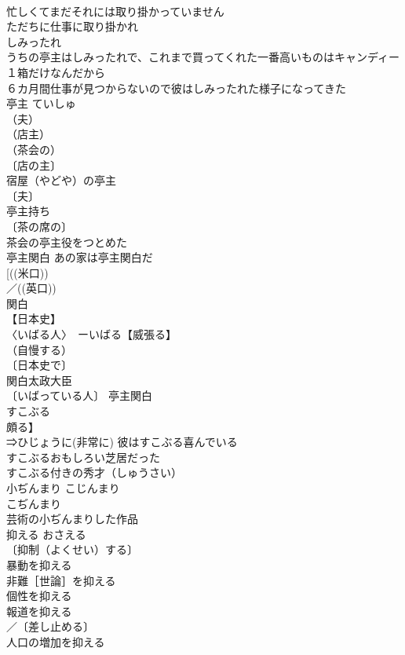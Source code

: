 \documentclass[8pt]{extreport}
\begin{document}
\begin{CJK}{UTF8}{min}
\\	忙しくてまだそれには取り掛かっていません 
\\	ただちに仕事に取り掛かれ 
\\	しみったれ		
\\	うちの亭主はしみったれで、これまで買ってくれた一番高いものはキャンディー１箱だけなんだから 
\\	６カ月間仕事が見つからないので彼はしみったれた様子になってきた 
\\	亭主	ていしゅ	
\\	（夫）
\\	（店主）
\\	（茶会の）
\\	〔店の主〕
\\	宿屋（やどや）の亭主 
\\	〔夫〕
\\	亭主持ち 
\\	〔茶の席の〕
\\	茶会の亭主役をつとめた 
\\	亭主関白 あの家は亭主関白だ 
\\	[((米口)) 
\\	／((英口)) 
\\	関白		
\\	【日本史】 
\\	〈いばる人〉　ーいばる【威張る】 
\\	（自慢する）
\\	〔日本史で〕
\\	関白太政大臣 
\\	〔いばっている人〕 亭主関白 
\\	すこぶる	
\\	頗る】	
\\	⇒ひじょうに(非常に) 彼はすこぶる喜んでいる 
\\	すこぶるおもしろい芝居だった 
\\	すこぶる付きの秀才（しゅうさい） 
\\	小ぢんまり	こじんまり 
\\	こぢんまり	
\\	芸術の小ぢんまりした作品 
\\	抑える	おさえる	
\\	〔抑制（よくせい）する〕
\\	暴動を抑える 
\\	非難［世論］を抑える 
\\	個性を抑える 
\\	報道を抑える 
\\	／〔差し止める〕
\\	人口の増加を抑える 

\end{CJK}
\end{document}
